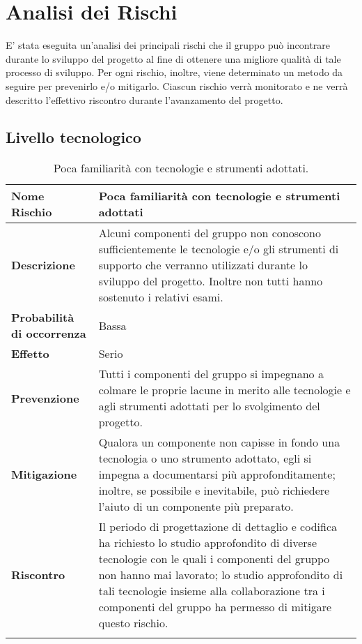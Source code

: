 \documentclass[../PianoDiProgetto.tex]{subfiles}
\begin{document}
	\section{Analisi dei Rischi}
	E' stata eseguita un'analisi dei principali rischi che il gruppo può incontrare
	durante lo sviluppo del progetto al fine di ottenere una migliore qualità di tale
	processo di sviluppo. Per ogni rischio, inoltre, viene determinato un metodo
	da seguire per prevenirlo e/o mitigarlo. Ciascun rischio verrà monitorato e ne
	verrà descritto l'effettivo riscontro durante l'avanzamento del progetto.
		\subsection{Livello tecnologico}
			\begin{table}[H]
				\center
				\begin{tabularx}{\textwidth}{X X}
					\noalign{\hrule height 1.5pt}
					\textbf{Nome Rischio} & Poca familiarità con tecnologie e strumenti adottati \\
					\hline
					\textbf{Descrizione}  & Alcuni componenti del gruppo non conoscono
					sufficientemente le tecnologie e/o gli strumenti
					di supporto che verranno utilizzati durante lo
					sviluppo del progetto. Inoltre non tutti hanno
					sostenuto i relativi esami.  \\
					\hline
					\textbf{Probabilità di occorrenza}  & Bassa  \\
					\hline
					\textbf{Effetto}  & Serio  \\
					\hline
					\textbf{Prevenzione}  & Tutti i componenti del gruppo si impegnano a
					colmare le proprie lacune in merito alle
					tecnologie e agli strumenti adottati per lo
					svolgimento del progetto.  \\
					\hline
					\textbf{Mitigazione}  & Qualora un componente non capisse in fondo una
tecnologia o uno strumento adottato, egli si impegna a documentarsi più approfonditamente;
inoltre, se possibile e inevitabile, può richiedere
l'aiuto di un componente più preparato. \\
					\hline
					\textbf{Riscontro} & Il periodo di progettazione di dettaglio e codifica ha richiesto lo studio approfondito di diverse tecnologie con le quali i componenti del gruppo non hanno mai lavorato; lo studio approfondito di tali tecnologie insieme alla collaborazione tra i componenti del gruppo ha permesso di mitigare questo rischio. \\
					\noalign{\hrule height 1.5pt}
			\end{tabularx}
			\caption{Poca familiarità con tecnologie e strumenti adottati. \label{tab:table_label}}
		\end{table}
		
\end{document}

